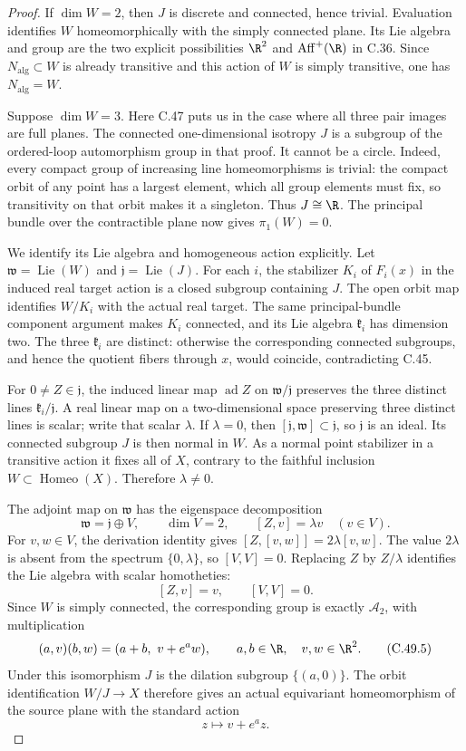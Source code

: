 \begin{proof}
If $\dim W=2$, then $J$ is discrete and connected, hence
trivial. Evaluation identifies $W$ homeomorphically with
the simply connected plane. Its Lie algebra and group are
the two explicit possibilities $\R^2$ and
$\operatorname{Aff}^+(\R)$ in C.36.
Since $N_{\mathrm{alg}}\subset W$ is already transitive
and this action of $W$ is simply transitive, one has
$N_{\mathrm{alg}}=W$.

Suppose $\dim W=3$. Here C.47 puts us in the case where all
three pair images are full planes.
The connected one-dimensional isotropy $J$ is a subgroup
of the ordered-loop automorphism group in that proof.
It cannot be a circle. Indeed, every compact group of
increasing line homeomorphisms is trivial: the compact orbit
of any point has a largest element, which all group elements
must fix, so transitivity on that orbit makes it a singleton.
Thus $J\cong\R$. The principal bundle over the contractible
plane now gives $\pi_1(W)=0$.

We identify its Lie algebra and homogeneous action explicitly.
Let $\mathfrak w=\operatorname{Lie}(W)$ and
$\mathfrak j=\operatorname{Lie}(J)$.
For each $i$, the stabilizer $K_i$ of $F_i(x)$ in the
induced real target action is a closed subgroup containing
$J$. The open orbit map identifies $W/K_i$ with the actual
real target. The same principal-bundle component argument
makes $K_i$ connected, and its Lie algebra $\mathfrak k_i$
has dimension two.
The three $\mathfrak k_i$ are distinct: otherwise the
corresponding connected subgroups, and hence the quotient
fibers through $x$, would coincide, contradicting C.45.

For $0\ne Z\in\mathfrak j$, the induced linear map
$\operatorname{ad}Z$ on $\mathfrak w/\mathfrak j$ preserves
the three distinct lines $\mathfrak k_i/\mathfrak j$.
A real linear map on a two-dimensional space preserving
three distinct lines is scalar; write that scalar $\lambda$.
If $\lambda=0$, then
$[\mathfrak j,\mathfrak w]\subset\mathfrak j$, so
$\mathfrak j$ is an ideal.
Its connected subgroup $J$ is then normal in $W$.
As a normal point stabilizer in a transitive action it fixes
all of $X$, contrary to the faithful inclusion
$W\subset\operatorname{Homeo}(X)$.
Therefore $\lambda\ne0$.

The adjoint map on $\mathfrak w$ has the eigenspace
decomposition
\[
 \mathfrak w=\mathfrak j\oplus V,\qquad
 \dim V=2,\qquad [Z,v]=\lambda v\quad(v\in V).
 \]
For $v,w\in V$, the derivation identity gives
$[Z,[v,w]]=2\lambda[v,w]$.
The value $2\lambda$ is absent from the spectrum
$\{0,\lambda\}$, so $[V,V]=0$.
Replacing $Z$ by $Z/\lambda$ identifies the Lie algebra
with scalar homotheties:
\[
              [Z,v]=v,\qquad [V,V]=0.                  \tag{C.49.4}
\]
Since $W$ is simply connected, the corresponding group
is exactly $\mathcal A_2$, with multiplication
\[
        (a,v)(b,w)=(a+b,\ v+e^a w),
        \qquad a,b\in\R,\quad v,w\in\R^2.               \tag{C.49.5}
\]
Under this isomorphism $J$ is the dilation subgroup
$\{(a,0)\}$. The orbit identification
$W/J\to X$ therefore gives an actual equivariant
homeomorphism of the source plane with the standard action
\[
                         z\longmapsto v+e^a z .
                                                        \tag{C.49.6}
\]


\end{proof}
